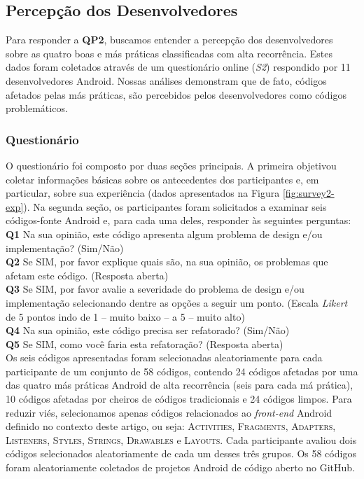 \subsection{Percepção dos Desenvolvedores}
\label{sub:perception}

Para responder a \textbf{QP2}, buscamos entender a percepção dos desenvolvedores sobre as quatro boas e más práticas classificadas com alta recorrência. Estes dados foram coletados através de um questionário online (\textit{S2}) respondido por 11 desenvolvedores Android. Nossas análises demonstram que de fato, códigos afetados pelas más práticas, são percebidos pelos desenvolvedores como códigos problemáticos.

\subsubsection{Questionário}
\label{sub:perception-survey}


O questionário foi composto por duas seções principais. A primeira objetivou coletar informações básicas sobre os antecedentes dos participantes e, em particular, sobre sua experiência (dados apresentados na Figura \ref{fig:survey2-exp}). Na segunda seção, os participantes foram solicitados a examinar seis códigos-fonte Android e, para cada uma deles, responder às seguintes perguntas: \\

\noindent
\textbf{Q1} Na sua opinião, este código apresenta algum problema de design e/ou implementação? (Sim/Não) \\

\noindent
\textbf{Q2} Se SIM, por favor explique quais são, na sua opinião, os problemas que afetam este código. (Resposta aberta) \\

\noindent
\textbf{Q3} Se SIM, por favor avalie a severidade do problema de design e/ou implementação selecionando dentre as opções a seguir um ponto. (Escala \textit{Likert} de 5 pontos indo de 1 -- muito baixo -- a 5 -- muito alto) \\

\noindent
\textbf{Q4} Na sua opinião, este código precisa ser refatorado? (Sim/Não) \\

\noindent
\textbf{Q5} Se SIM, como você faria esta refatoração? (Resposta aberta) \\

Os seis códigos apresentadas foram selecionadas aleatoriamente para cada participante de um conjunto de 58 códigos, contendo 24 códigos afetadas por uma das quatro más práticas Android de alta recorrência (seis para cada má prática), 10 códigos afetadas por cheiros de códigos tradicionais e 24 códigos limpos. Para reduzir viés, selecionamos apenas códigos relacionados ao \textit{front-end} Android definido no contexto deste artigo, ou seja: \textsc{Activities}, \textsc{Fragments}, \textsc{Adapters}, \textsc{Listeners}, \textsc{Styles}, \textsc{Strings}, \textsc{Drawables} e \textsc{Layouts}. Cada participante avaliou dois códigos selecionados aleatoriamente de cada um desses três grupos. Os 58 códigos foram aleatoriamente coletados de projetos Android de código aberto no GitHub.

